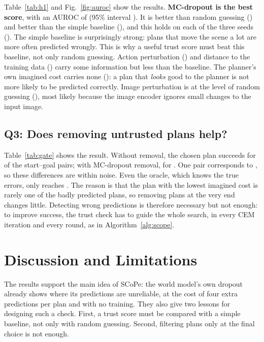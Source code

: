 \documentclass[conference]{IEEEtran}
\begin{document}
Table~\ref{tab:h1} and Fig.~\ref{fig:auroc} show the results. \textbf{MC-dropout is the best score}, with an AUROC of
\HMC{} (95\% interval \HMCCI{}). It is better than random guessing (\HRand{}) and better than the simple baseline
(\HDist{}), and this holds on each of the three seeds (\HMCPerSeed{}). The simple baseline is surprisingly strong:
plans that move the scene a lot are more often predicted wrongly. This is why a useful trust score must beat this
baseline, not only random guessing. Action perturbation (\HAct{}) and distance to the training data (\HKnn{}) carry
some information but less than the baseline. The planner's own imagined cost carries none (\HCost{}): a plan that
\emph{looks} good to the planner is not more likely to be predicted correctly. Image perturbation is at the level of
random guessing (\HObs{}), most likely because the image encoder ignores small changes to the input image.

\subsection{Q3: Does removing untrusted plans help?}

\begin{table}[t]
\caption{Success of the chosen plan after removing 30\% of the recorded plans, \HEpisodes{} start--goal pairs.}
\label{tab:gate}
\centering

\end{table}

Table~\ref{tab:gate} shows the result. Without removal, the chosen plan succeeds for \GatePlain{} of the start--goal
pairs; with MC-dropout removal, for \GateMC{}. One pair corresponds to \GateStep{}, so these differences are within
noise. Even the oracle, which knows the true errors, only reaches \GateOracle{}. The reason is that the plan with the
lowest imagined cost is rarely one of the badly predicted plans, so removing plans at the very end changes little.
Detecting wrong predictions is therefore necessary but not enough: to improve success, the trust check has to guide the
whole search, in every CEM iteration and every round, as in Algorithm~\ref{alg:scope}.

\section{Discussion and Limitations}

The results support the main idea of SCoPe: the world model's own dropout already shows where its predictions are
unreliable, at the cost of four extra predictions per plan and with no training. They also give two lessons for
designing such a check. First, a trust score must be compared with a simple baseline, not only with random guessing.
Second, filtering plans only at the final choice is not enough.
\end{document}
